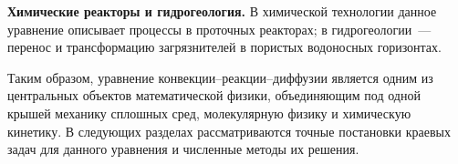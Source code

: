         \textbf{Химические реакторы и гидрогеология.}
        В химической технологии данное уравнение описывает процессы в проточных
        реакторах; в гидрогеологии~--- перенос и трансформацию загрязнителей
        в пористых водоносных горизонтах.

        Таким образом, уравнение конвекции--реакции--диффузии
        является одним из центральных объектов математической физики,
        объединяющим под одной крышей механику сплошных сред,
        молекулярную физику и химическую кинетику.
        В следующих разделах рассматриваются точные постановки краевых задач
        для данного уравнения и численные методы их решения.
